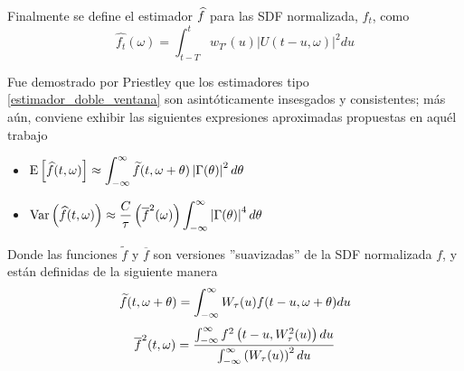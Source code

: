 
%

Finalmente se define el estimador $\widehat{ f }$ para las SDF normalizada, $f_t$, 
como
\begin{equation*}
\widehat{f_t}(\omega) = \int_{t-T}^{t} w_{T'}(u) \lvert U(t-u,\omega) \lvert^{2} du
\label{estimador_doble_ventana}
\end{equation*}

Fue demostrado por Priestley \cite{Priestley65} que los estimadores tipo
\ref{estimador_doble_ventana} son asint\'oticamente insesgados y consistentes;
m\'as a\'un, conviene exhibir las siguientes expresiones aproximadas propuestas en aqu\'el trabajo
\begin{itemize}
\item $\displaystyle
\mathrm{E}\left[ \widehat{ f }(t,\omega) \right] \approx 
\int_{-\infty}^{\infty} \widetilde{f}(t,\omega+\theta) \left| \Gamma(\theta) \right|^{2} d\theta$
\item $\displaystyle
\mathrm{Var}\left( \widehat{ f }(t,\omega) \right) \approx \frac{C}{\tau} \left( \overline{f}^{2}(\omega) \right)
\int_{-\infty}^{\infty} \left| \Gamma(\theta) \right|^{4} d\theta $
\end{itemize}

Donde las funciones $\widetilde{f}$ y $\overline{f}$ son versiones ''suavizadas'' de la
SDF normalizada $f$, y est\'an definidas de la siguiente manera
\begin{equation*}
\widetilde{f}(t,\omega+\theta) = 
\int_{-\infty}^{\infty} W_{\tau}(u) f(t-u,\omega+\theta) du
\end{equation*}
\begin{equation*}
\overline{f}^{2} (t,\omega) =
\frac{\int_{-\infty}^{\infty} f^{2}\left(t-u,W_{\tau}^{2}(u)\right) du}
{\int_{-\infty}^{\infty} \left( W_{\tau}(u) \right)^{2} du}
\end{equation*}

